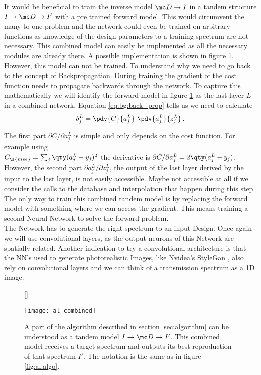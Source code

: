 It would be beneficial to train the inverse model $\mc D \rightarrow I$ in a tandem structure 
$I \rightarrow \mc D \rightarrow I'$ with a pre trained forward model.
This would circumvent the many-to-one problem and the network could even be trained on arbitrary functions as knowledge of the design parameters to a training spectrum are not necessary.
This combined model can easily be implemented as all the necessary modules are already there. A possible implementation is shown in figure \ref{fig:al:combined}.
However, this model can not be trained.
To understand why we need to go back to the concept of {\hyperref[eq:bg:back_prop]{Backpropagation}}.
During training the gradient of the cost function needs to propagate backwards through the network. To capture this mathematically we will identify the forward model in figure \ref{fig:al:combined} as the last layer $L$ in a combined network. Equation \eqref{eq:bg:back_prop} tells us we need to calculate
\begin{equation}
    \delta^L_j = \pdv{C}{a^L_j} \ \pdv{a^L_j}{z^L_j} \,.
\end{equation}

The first part $\partial C / \partial{a^L_j}$ is simple and only depends on the cost function. For example using \\
$C_\s{mse} = \sum_j \qty(a_j^L - y_j)^2$
the derivative is 
$\partial{C} / \partial{a^L_j} = 2 \qty(a_j^L - y_j)$.
However, the second part 
$\partial{a^L_j} / \partial{z^L_j}$,
the output of the last layer derived by the input to the last layer, is not easily accessible. Maybe not accessible at all if we consider the calls to the database and interpolation that happen during this step. The only way to train this combined tandem model is by replacing the forward model with something where we can access the gradient. This means training a second Neural Network to solve the forward problem.
\\

\indent
The Network has to generate the right spectrum to an input Design. Once again we will use convolutional layers, as the output neurons of this Network are spatially related. Another indication to try a convolutional architecture is that the NN's used to generate photorealistic Images, like Nvidea's StyleGan \cite{Karras2018}, also rely on convolutional layers and we can think of a transmission spectrum as a 1D image.

\begin{figure}[H]
    [\FBwidth]
    {\caption{
        A part of the algorithm described in section \ref{sec:algorithm} can be understood as a tandem model 
        $I \rightarrow \mc D \rightarrow I'$.
        This combined model receives a target spectrum and outputs its best reproduction of that spectrum $I'$. The notation is the same as in figure \ref{fig:al:algo}.
    }
    \label{fig:al:combined}}
    {\texttt{[image: al\_combined]}}
\end{figure}

